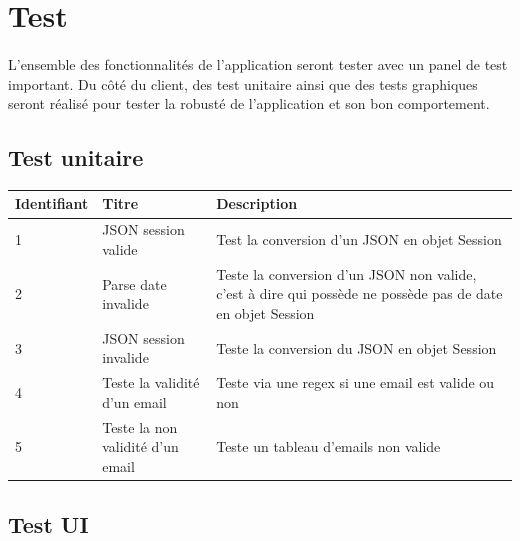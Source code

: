 \documentclass[titlepage, 12pt]{report}
\begin{document}
\clearpage


\section{Test}

\paragraph{}L'ensemble des fonctionnalités de l'application seront tester avec un panel de test important. Du côté du client, des test unitaire ainsi que des tests graphiques seront réalisé pour tester la robusté de l'application et son bon comportement.

\subsection{Test unitaire}

\begin{table}[ht]
\begin{tabularx}{\textwidth}{|X|X|X|}
	\hline
	Identifiant & Titre & Description \\
	\hline
	1 & JSON session valide & Test la conversion d'un JSON en objet Session \\
	\hline
	2 & Parse date invalide & Teste la conversion d'un JSON non valide, c'est à dire qui possède ne possède pas de date en objet Session \\
	\hline
	3 & JSON session invalide & Teste la conversion du JSON en objet Session \\
	\hline
	4 & Teste la validité d'un email & Teste via une regex si une email est valide ou non \\
	\hline
	5 & Teste la non validité d'un email & Teste un tableau d'emails non valide \\
	\hline \hline
\end{tabularx}
\end{table}

\subsection{Test UI}
\end{document}
